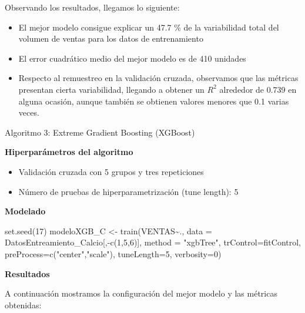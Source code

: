 \documentclass[
]{article}
\newenvironment{Shaded}{\begin{snugshade}}{\end{snugshade}}
\newcommand{\AttributeTok}[1]{\textcolor[rgb]{0.77,0.63,0.00}{#1}}
\newcommand{\DecValTok}[1]{\textcolor[rgb]{0.00,0.00,0.81}{#1}}
\newcommand{\FunctionTok}[1]{\textcolor[rgb]{0.00,0.00,0.00}{#1}}
\newcommand{\NormalTok}[1]{#1}
\newcommand{\OtherTok}[1]{\textcolor[rgb]{0.56,0.35,0.01}{#1}}
\newcommand{\SpecialCharTok}[1]{\textcolor[rgb]{0.00,0.00,0.00}{#1}}
\newcommand{\StringTok}[1]{\textcolor[rgb]{0.31,0.60,0.02}{#1}}
\providecommand{\tightlist}{%
  \setlength{\itemsep}{0pt}\setlength{\parskip}{0pt}}
\begin{document}
Observando los resultados, llegamos lo siguiente:

\begin{itemize}
\tightlist
\item
  El mejor modelo consigue explicar un 47.7 \% de la variabilidad total
  del volumen de ventas para los datos de entrenamiento
\item
  El error cuadrático medio del mejor modelo es de 410 unidades
\item
  Respecto al remuestreo en la validación cruzada, observamos que las
  métricas presentan cierta variabilidad, llegando a obtener un \(R^2\)
  alrededor de 0.739 en alguna ocasión, aunque también se obtienen
  valores menores que 0.1 varias veces.
\end{itemize}

Algoritmo 3: Extreme Gradient Boosting (XGBoost)

\textbf{Hiperparámetros del algoritmo}

\begin{itemize}
\tightlist
\item
  Validación cruzada con 5 grupos y tres repeticiones
\item
  Número de pruebas de hiperparametrización (tune length): 5
\end{itemize}

\textbf{Modelado}

\begin{Shaded}
\begin{Highlighting}[]
\FunctionTok{set.seed}\NormalTok{(}\DecValTok{17}\NormalTok{)}
\NormalTok{modeloXGB\_C }\OtherTok{\textless{}{-}} \FunctionTok{train}\NormalTok{(VENTAS}\SpecialCharTok{\textasciitilde{}}\NormalTok{., }
                \AttributeTok{data =}\NormalTok{ DatosEntreamiento\_Calcio[,}\SpecialCharTok{{-}}\FunctionTok{c}\NormalTok{(}\DecValTok{1}\NormalTok{,}\DecValTok{5}\NormalTok{,}\DecValTok{6}\NormalTok{)], }
                \AttributeTok{method =} \StringTok{"xgbTree"}\NormalTok{,}
                \AttributeTok{trControl=}\NormalTok{fitControl, }
                \AttributeTok{preProcess=}\FunctionTok{c}\NormalTok{(}\StringTok{"center"}\NormalTok{,}\StringTok{"scale"}\NormalTok{),}
                \AttributeTok{tuneLength=}\DecValTok{5}\NormalTok{,}
                \AttributeTok{verbosity=}\DecValTok{0}\NormalTok{)}
\end{Highlighting}
\end{Shaded}

\textbf{Resultados}

A continuación mostramos la configuración del mejor modelo y las
métricas obtenidas:
\end{document}
